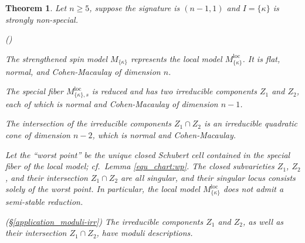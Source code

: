 \documentclass[pdflatex,sn-mathphys-num]{sn-jnl}%
\theoremstyle{thmstyleone}%
\newtheorem{theorem}[subsubsection]{Theorem}%
\theoremstyle{thmstyletwo}%
\numberwithin{equation}{subsection}
\theoremstyle{thmstylethree}%
\newcommand{\loc}{\ensuremath{\mathrm{loc}}\xspace}
\newenvironment{altenumerate}
	{\begin{list}
			{(\theenumi) }
			{\usecounter{enumi}
				\setlength{\labelwidth}{0pt}
				\setlength{\labelsep}{0pt}
				\setlength{\leftmargin}{0pt}
				\setlength{\itemsep}{\the\smallskipamount}
				\renewcommand{\theenumi}{\roman{enumi}}
		}}
		{\end{list}}
\begin{document}
\begin{theorem}\label{intro_back:max}
Let $n\geq 5$, suppose the signature is $(n-1,1)$ and $I=\{\kappa\}$ is strongly non-special. 
\begin{altenumerate}
\item The strengthened spin model $M_{\{\kappa\}}$ represents the local model $M^\loc_{\{\kappa\}}$. It is flat, normal, and Cohen-Macaulay of dimension $n$.
\item The special fiber $M^\loc_{\{\kappa\},s}$ is reduced and has two irreducible components $Z_1$ and $Z_2$, each of which is normal and Cohen-Macaulay of dimension $n-1$.
\item The intersection of the irreducible components $Z_1\cap Z_2$ is an irreducible quadratic cone of dimension $n-2$, which is normal and Cohen-Macaulay.
\item Let the ``worst point'' be the unique closed Schubert cell contained in the special fiber of the local model; cf.\ Lemma \ref{equ_chart:wp}.
The closed subvarieties $Z_1$, $Z_2$, and their intersection $Z_1\cap Z_2$ are all singular, and their singular locus consists solely of the worst point. 
In particular, the local model $M^\loc_{\{\kappa\}}$ does not admit a semi-stable reduction.
\item(\S \ref{application_moduli-irr})  The irreducible components $Z_1$ and $Z_2$, as well as their intersection $Z_1\cap Z_2$, have moduli descriptions.
\end{altenumerate}
\end{theorem}
\end{document}
